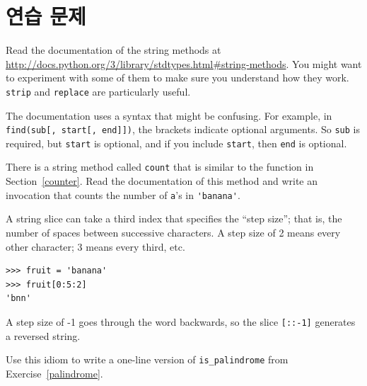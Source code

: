 \documentclass[10pt]{book}
\begin{document}
\section{연습 문제}

\begin{exercise}

Read the documentation of the string methods at
\url{http://docs.python.org/3/library/stdtypes.html#string-methods}.
You might want to experiment with some of them to make sure you
understand how they work.  {\tt strip} and {\tt replace} are
particularly useful.

The documentation uses a syntax that might be confusing.
For example, in \verb"find(sub[, start[, end]])", the brackets
indicate optional arguments.  So {\tt sub} is required, but
{\tt start} is optional, and if you include {\tt start},
then {\tt end} is optional.

\end{exercise}


\begin{exercise}

There is a string method called {\tt count} that is similar
to the function in Section~\ref{counter}.  Read the documentation
of this method
and write an invocation that counts the number of {\tt a}'s
in \verb"'banana'".
\end{exercise}


\begin{exercise}

A string slice can take a third index that specifies the ``step
size''; that is, the number of spaces between successive characters.
A step size of 2 means every other character; 3 means every third,
etc.

\begin{verbatim}
>>> fruit = 'banana'
>>> fruit[0:5:2]
'bnn'
\end{verbatim}

A step size of -1 goes through the word backwards, so
the slice \verb"[::-1]" generates a reversed string.

Use this idiom to write a one-line version of \verb"is_palindrome"
from Exercise~\ref{palindrome}.
\end{exercise}
\end{document}
